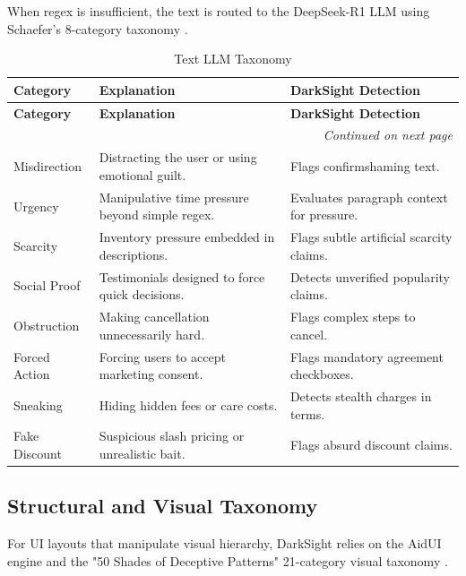 \documentclass[12pt,a4paper]{article}
\begin{document}
\vspace{1em}
\noindent When regex is insufficient, the text is routed to the DeepSeek-R1 LLM using Schaefer's 8-category taxonomy \cite{schaefer2023, incontext2023}.
\vspace{1em}

\begin{longtable}{|p{}|p{}|p{}|}
\caption{Text LLM Taxonomy \cite{schaefer2023}} \label{tab:llm_tax} \\
\hline
\textbf{Category} & \textbf{Explanation} & \textbf{DarkSight Detection} \\ \hline
\endfirsthead
\hline
\textbf{Category} & \textbf{Explanation} & \textbf{DarkSight Detection} \\ \hline
\endhead
\hline
\multicolumn{3}{|r|}{\textit{Continued on next page}} \\
\hline
\endfoot
\hline
\endlastfoot
Misdirection & Distracting the user or using emotional guilt. & Flags confirmshaming text. \\ \hline
Urgency & Manipulative time pressure beyond simple regex. & Evaluates paragraph context for pressure. \\ \hline
Scarcity & Inventory pressure embedded in descriptions. & Flags subtle artificial scarcity claims. \\ \hline
Social Proof & Testimonials designed to force quick decisions. & Detects unverified popularity claims. \\ \hline
Obstruction & Making cancellation unnecessarily hard. & Flags complex steps to cancel. \\ \hline
Forced Action & Forcing users to accept marketing consent. & Flags mandatory agreement checkboxes. \\ \hline
Sneaking & Hiding hidden fees or care costs. & Detects stealth charges in terms. \\ \hline
Fake Discount & Suspicious slash pricing or unrealistic bait. & Flags absurd discount claims. \\ \hline
\end{longtable}

\subsection{Structural and Visual Taxonomy}
For UI layouts that manipulate visual hierarchy, DarkSight relies on the AidUI engine \cite{aidui2023} and the "50 Shades of Deceptive Patterns" 21-category visual taxonomy \cite{50shades}.
\end{document}
